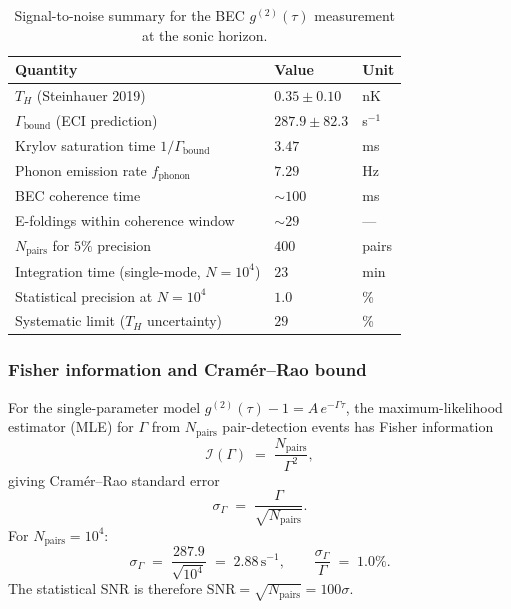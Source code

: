 \documentclass[12pt,a4paper]{article}
\begin{document}
\begin{table}[h]
\centering
\begin{tabular}{lll}
\toprule
Quantity & Value & Unit \\
\midrule
$T_H$ (Steinhauer 2019) & $0.35 \pm 0.10$ & nK \\
$\Gamma_{\mathrm{bound}}$ (ECI prediction) & $287.9 \pm 82.3$ & s$^{-1}$ \\
Krylov saturation time $1/\Gamma_{\mathrm{bound}}$ & $3.47$ & ms \\
Phonon emission rate $f_{\mathrm{phonon}}$ & $7.29$ & Hz \\
BEC coherence time & $\sim 100$ & ms \\
E-foldings within coherence window & $\sim 29$ & --- \\
$N_{\mathrm{pairs}}$ for $5\%$ precision & $400$ & pairs \\
Integration time (single-mode, $N=10^4$) & $23$ & min \\
Statistical precision at $N=10^4$ & $1.0$ & \% \\
Systematic limit ($T_H$ uncertainty) & $29$ & \% \\
\bottomrule
\end{tabular}
\caption{Signal-to-noise summary for the BEC $g^{(2)}(\tau)$
measurement at the sonic horizon.}
\label{tab:bec-sn}
\end{table}

\subsubsection{Fisher information and Cramér--Rao bound}

For the single-parameter model $g^{(2)}(\tau) - 1 = A\,e^{-\Gamma\tau}$,
the maximum-likelihood estimator (MLE) for $\Gamma$ from $N_{\mathrm{pairs}}$
pair-detection events has Fisher information
\begin{equation}
  \mathcal{I}(\Gamma) \;=\; \frac{N_{\mathrm{pairs}}}{\Gamma^2},
\end{equation}
giving Cram\'{e}r--Rao standard error
\begin{equation}
  \sigma_\Gamma \;=\; \frac{\Gamma}{\sqrt{N_{\mathrm{pairs}}}}.
\end{equation}
For $N_{\mathrm{pairs}} = 10^4$:
\begin{equation}
  \sigma_\Gamma \;=\; \frac{287.9}{\sqrt{10^4}} \;=\; 2.88\,\mathrm{s}^{-1},
  \qquad
  \frac{\sigma_\Gamma}{\Gamma} \;=\; 1.0\%.
\end{equation}
The statistical SNR is therefore $\mathrm{SNR} = \sqrt{N_{\mathrm{pairs}}}
= 100\sigma$.
\end{document}
